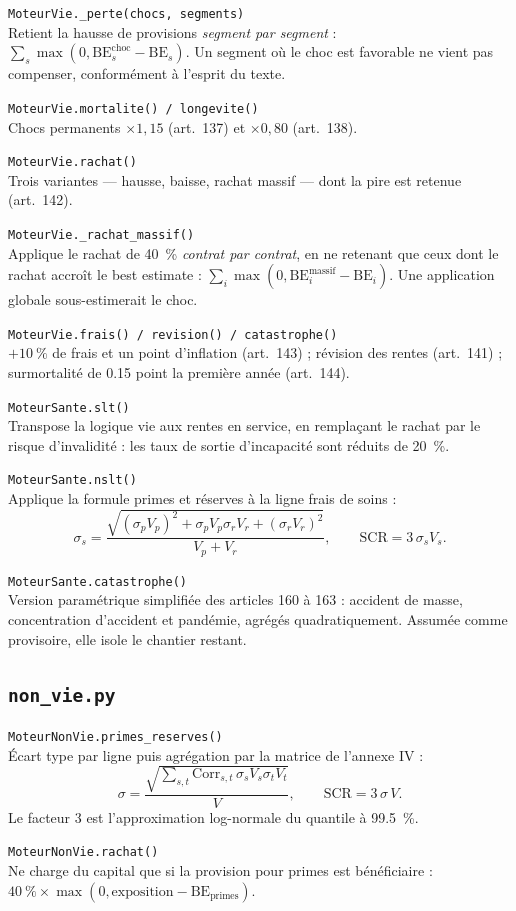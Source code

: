 \documentclass[10pt,a4paper]{article}
\newcommand{\fn}[2]{\par\smallskip\textcolor{bleufonce}{\texttt{#1}}\\ #2\par}
\newcommand{\art}[1]{\textcolor{gris}{\small (art.~#1)}}
\begin{document}
\fn{MoteurVie.\_perte(chocs, segments)}{Retient la hausse de provisions \emph{segment par
segment} : $\sum_s \max(0, \mathrm{BE}^{\text{choc}}_s - \mathrm{BE}_s)$. Un segment où le choc
est favorable ne vient pas compenser, conformément à l'esprit du texte.}

\fn{MoteurVie.mortalite() / longevite()}{Chocs permanents $\times 1{,}15$ \art{137} et
$\times 0{,}80$ \art{138}.}

\fn{MoteurVie.rachat()}{Trois variantes — hausse, baisse, rachat massif — dont la pire est
retenue \art{142}.}

\fn{MoteurVie.\_rachat\_massif()}{Applique le rachat de \qty{40}{\percent} \emph{contrat par
contrat}, en ne retenant que ceux dont le rachat accroît le best estimate :
$\sum_i \max(0, \mathrm{BE}^{\text{massif}}_i - \mathrm{BE}_i)$. Une application globale
sous-estimerait le choc.}

\fn{MoteurVie.frais() / revision() / catastrophe()}{$+\qty{10}{\percent}$ de frais et un point
d'inflation \art{143} ; révision des rentes \art{141} ; surmortalité de \num{0.15} point la
première année \art{144}.}

\fn{MoteurSante.slt()}{Transpose la logique vie aux rentes en service, en remplaçant le rachat
par le risque d'invalidité : les taux de sortie d'incapacité sont réduits de \qty{20}{\percent}.}

\fn{MoteurSante.nslt()}{Applique la formule primes et réserves à la ligne frais de soins :
\[
\sigma_s = \frac{\sqrt{(\sigma_p V_p)^2 + \sigma_p V_p \sigma_r V_r + (\sigma_r V_r)^2}}{V_p+V_r},
\qquad \mathrm{SCR} = 3\,\sigma_s V_s.
\]}

\fn{MoteurSante.catastrophe()}{Version paramétrique simplifiée des articles 160 à 163 : accident
de masse, concentration d'accident et pandémie, agrégés quadratiquement. Assumée comme
provisoire, elle isole le chantier restant.}

\subsection{\texttt{non\_vie.py}}

\fn{MoteurNonVie.primes\_reserves()}{Écart type par ligne puis agrégation par la matrice de
l'annexe IV :
\[
\sigma = \frac{\sqrt{\sum_{s,t}\mathrm{Corr}_{s,t}\,\sigma_s V_s \sigma_t V_t}}{V},
\qquad \mathrm{SCR} = 3\,\sigma\,V .
\]
Le facteur 3 est l'approximation log-normale du quantile à \qty{99.5}{\percent}.}

\fn{MoteurNonVie.rachat()}{Ne charge du capital que si la provision pour primes est bénéficiaire :
$\qty{40}{\percent} \times \max(0, \text{exposition} - \mathrm{BE}_{\text{primes}})$.}
\end{document}
